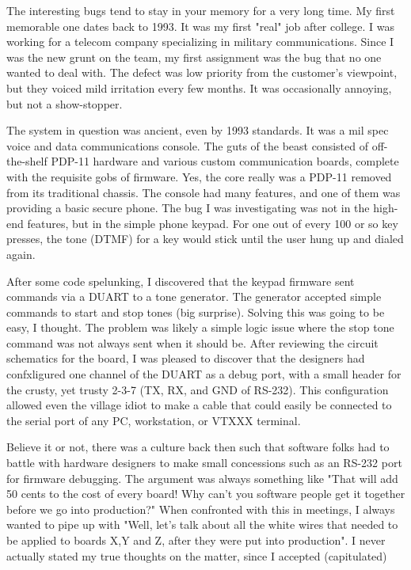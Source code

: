 The interesting bugs tend to stay in your memory for a very long time. My first
memorable one dates back to 1993. It was my first "real" job after college. I was
working for a telecom company specializing in military communications. Since I
was the new grunt on the team, my first assignment was the bug that no one
wanted to deal with. The defect was low priority from the customer's viewpoint,
but they voiced mild irritation every few months. It was occasionally annoying,
but not a show-stopper.
\par
The system in question was ancient, even by 1993 standards. It was a mil spec
voice and data communications console. The guts of the beast consisted of
off-the-shelf PDP-11 hardware and various custom communication boards, complete
with the requisite gobs of firmware. Yes, the core really was a PDP-11 removed
from its traditional chassis. The console had many features, and one of them was
providing a basic secure phone. The bug I was investigating was not in the
high-end features, but in the simple phone keypad. For one out of every 100 or
so key presses, the tone (DTMF) for a key would stick until the user hung up and
dialed again.
\par
After some code spelunking, I discovered that the keypad firmware sent commands
via a DUART to a tone generator. The generator accepted simple commands to start
and stop tones (big surprise). Solving this was going to be easy, I thought. The
problem was likely a simple logic issue where the stop tone command was not
always sent when it should be. After reviewing the circuit schematics for the
board, I was pleased to discover that the designers had confxligured one channel
of the DUART as a debug port, with a small header for the crusty, yet trusty
2-3-7 (TX, RX, and GND of RS-232). This configuration allowed even the village
idiot to make a cable that could easily be connected to the serial port of any
PC, workstation, or VTXXX terminal.
\par
Believe it or not, there was a culture back then such that software folks had to
battle with hardware designers to make small concessions such as an RS-232 port
for firmware debugging. The argument was always something like "That will add 50
cents to the cost of every board! Why can't you software people get it together
before we go into production?" When confronted with this in meetings, I always
wanted to pipe up with "Well, let's talk about all the white wires that needed
to be applied to boards X,Y and Z, after they were put into production". I never
actually stated my true thoughts on the matter, since I accepted (capitulated)

